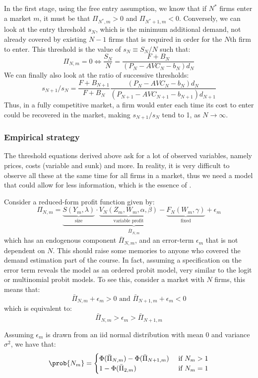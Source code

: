 In the first stage, using the free entry assumption, we know that if $N^*$ firms enter a market $m$, it must be that $\Pi_{N^*,m} > 0$ and $\Pi_{N^*+1,m} < 0$. Conversely, we can look at the entry threshold $s_N$, which is the minimum additional demand, not already covered by existing $N-1$ firms that is required in order for the $N$th firm to enter. This threshold is the value of $s_N \equiv S_N/N$ such that: $$\Pi_{N,m} = 0 \Leftrightarrow \frac{S_N}{N} = \frac{F + B_N}{(P_N - AVC_N - b_N)d_N} $$ We can finally also look at the ratio of successive thresholds: $$s_{N+1}/s_N = \frac{F + B_{N+1}}{F + B_N}\frac{(P_N - AVC_{N} - b_N)d_N}{(P_{N+1} - AVC_{N+1} - b_{N+1})d_{N+1}} $$ Thus, in a fully competitive market, a firm would enter each time its cost to enter could be recovered in the market, making $s_{N+1}/s_N$ tend to 1, as $N\to\infty$.

\subsubsection{Empirical strategy}

The threshold equations derived above ask for a lot of observed variables, namely prices, costs (variable and sunk) and more. In reality, it is very difficult to observe all these at the same time for all firms in a market, thus we need a model that could allow for less information, which is the essence of \cite{br_91}.

Consider a reduced-form profit function given by: $$\Pi_{N,m} = \underbrace{\underbrace{S(Y_m, \lambda)}_{\text{size}} \cdot \underbrace{V_{N}(Z_{m}, W_{m}, \alpha, \beta)}_{\text{variable profit}} - \underbrace{F_N(W_{m}, \gamma)}_{\text{fixed}}}_{\bar\Pi_{N,m}} + \epsilon_m $$ which has an endogenous component $\bar\Pi_{N,m}$, and an error-term $\epsilon_m$ that is not dependent on $N$. This should raise some memories to anyone who covered the demand estimation part of the course. In fact, assuming a specification on the error term reveals the model as an ordered probit model, very similar to the logit or multinomial probit models. To see this, consider a market with $N$ firms, this means that: $$ \bar\Pi_{N,m} + \epsilon_m > 0 \text{ and } \bar\Pi_{N+1,m} + \epsilon_m < 0 $$ which is equivalent to: $$ \bar\Pi_{N,m} > \epsilon_m > \bar\Pi_{N+1,m} $$

Assuming $\epsilon_m$ is drawn from an iid normal distribution with mean 0 and variance $\sigma^2$, we have that: $$\prob{N_m} = \begin{cases} \Phi(\bar\Pi_{N,m}) - \Phi(\bar\Pi_{N+1,m}) & \text{ if }N_m > 1 \\
1 - \Phi(\bar\Pi_{2,m}) & \text{ if }N_m = 1
\end{cases} $$

